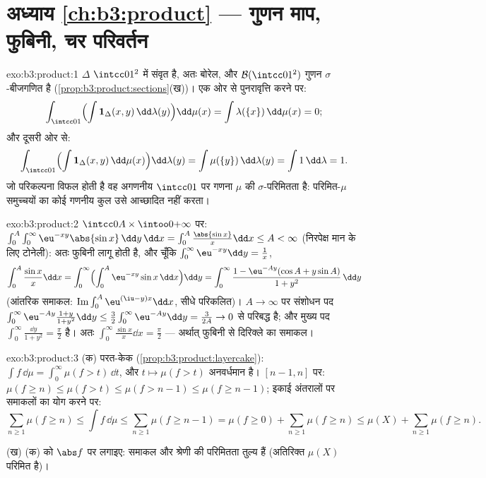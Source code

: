 \section*{अध्याय \ref{ch:b3:product} --- गुणन माप,
फुबिनी, चर परिवर्तन}

\begin{solution}{exo:b3:product:1}
$\Delta$ $\intcc01^2$ में संवृत है, अतः बोरेल, और $\mathcal
B(\intcc01^2)$ गुणन $\sigma$-बीजगणित है (\cref{prop:b3:product:sections}(ख))।
एक ओर से पुनरावृत्ति करने पर:
\[
\int_{\intcc01}\Bigl(\int \mathbf 1_\Delta(x,y)
\,\dd\lambda(y)\Bigr)\dd\mu(x)
= \int \lambda(\{x\})\,\dd\mu(x) = 0 ;
\]
और दूसरी ओर से:
\[
\int_{\intcc01}\Bigl(\int\mathbf
1_\Delta(x,y)\,\dd\mu(x)\Bigr)\dd\lambda(y)
= \int \mu(\{y\})\,\dd\lambda(y) = \int 1\,\dd\lambda = 1 .
\]
जो परिकल्पना विफल होती है वह अगणनीय $\intcc01$ पर गणना  $\mu$ की
$\sigma$-परिमितता है: परिमित-$\mu$ समुच्चयों का कोई गणनीय कुल उसे आच्छादित
नहीं करता।
\end{solution}

\begin{solution}{exo:b3:product:2}
$\intcc0A\times\intoo0{+\infty}$ पर: $\int_0^A\int_0^\infty\eu^{-xy}\abs{\sin x}\,\dd y\,\dd x =
\int_0^A\frac{\abs{\sin x}}x\dd x \leq A < \infty$ (निरपेक्ष मान के लिए टोनेली): अतः फुबिनी लागू होती
है, और चूँकि $\int_0^\infty\eu^{-xy}\dd y = \frac1x$,
\[
\int_0^A\frac{\sin x}x\dd x
= \int_0^\infty\Bigl(\int_0^A\eu^{-xy}\sin x\,\dd
x\Bigr)\dd y
= \int_0^\infty \frac{1 - \eu^{-Ay}(\cos A + y\sin A)}{1 +
y^2}\,\dd y
\]
(आंतरिक समाकल: $\operatorname{Im}\int_0^A\eu^{(\iu -
y)x}\dd x$, सीधे परिकलित)। $A \to \infty$ पर संशोधन पद $\int_0^\infty\eu^{-Ay}\frac{1 +
y}{1 + y^2}\dd y \leq \frac32\int_0^\infty\eu^{-Ay}\dd y =
\frac3{2A} \to 0$ से परिबद्ध
है; और मुख्य पद $\int_0^\infty\frac{\dd y}{1+y^2} = \frac\pi2$ है। अतः $\int_0^\infty\frac{\sin x}x\dd x = \frac\pi2$ --- अर्थात् फुबिनी से दिरिक्ले
का समाकल।
\end{solution}

\begin{solution}{exo:b3:product:3}
(क) परत-केक (\cref{prop:b3:product:layercake}): $\int
f\,\dd\mu = \int_0^\infty\mu(f > t)\,\dd t$, और $t \mapsto
\mu(f > t)$ अनवर्धमान है। $[n-1, n]$ पर: $\mu(f \geq n)
\leq \mu(f > t) \leq \mu(f > n - 1) \leq \mu(f \geq n - 1)$; इकाई
अंतरालों पर समाकलों का योग करने पर:
\[
\sum_{n\geq1}\mu(f \geq n) \leq \int f\,\dd\mu \leq
\sum_{n\geq1}\mu(f \geq n - 1) = \mu(f \geq 0) +
\sum_{n\geq1}\mu(f\geq n) \leq \mu(X) + \sum_{n\geq1}\mu(f\geq
n).
\]

(ख) (क) को $\abs f$ पर लगाइए: समाकल और श्रेणी की परिमितता तुल्य हैं
(अतिरिक्त $\mu(X)$ परिमित है)।
\end{solution}

